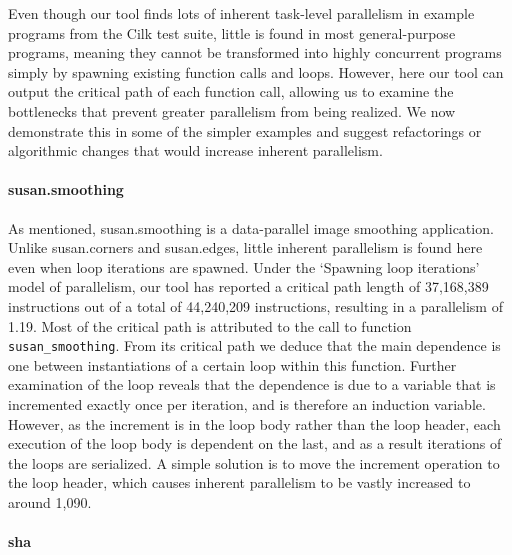 Even though our tool finds lots of inherent task-level parallelism in example programs from the Cilk test suite, little is found in most general-purpose programs, meaning they cannot be transformed into highly concurrent programs simply by spawning existing function calls and loops.
However, here our tool can output the critical path of each function call, allowing us to examine the bottlenecks that prevent greater parallelism from being realized.
We now demonstrate this in some of the simpler examples and suggest refactorings or algorithmic changes that would increase inherent parallelism.

\paragraph{\textsf{susan.smoothing}}

As mentioned, \textsf{susan.smoothing} is a data-parallel image smoothing application.
Unlike \textsf{susan.corners} and \textsf{susan.edges}, little inherent parallelism is found here even when loop iterations are spawned.
Under the `Spawning loop iterations' model of parallelism, our tool has reported a critical path length of 37,168,389 instructions out of a total of 44,240,209 instructions, resulting in a parallelism of 1.19.
Most of the critical path is attributed to the call to function \texttt{susan\_smoothing}.
From its critical path we deduce that the main dependence is one between instantiations of a certain loop within this function.
Further examination of the loop reveals that the dependence is due to a variable that is incremented exactly once per iteration, and is therefore an induction variable.
However, as the increment is in the loop body rather than the loop header, each execution of the loop body is dependent on the last, and as a result iterations of the loops are serialized.
A simple solution is to move the increment operation to the loop header, which causes inherent parallelism to be vastly increased to around 1,090.

\paragraph{\textsf{sha}}

